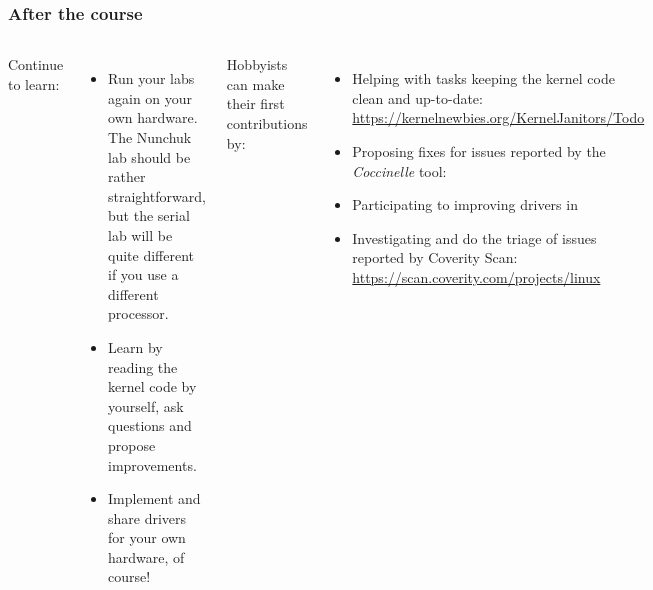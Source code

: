 \begin{frame}
  \frametitle{After the course}
  \begin{columns}
  Continue to learn:
  \begin{itemize}
  \item Run your labs again on your own hardware. The Nunchuk lab should
        be rather straightforward, but the serial lab will be quite different
	if you use a different processor.
  \item Learn by reading the kernel code by yourself, ask questions and
	propose improvements.
  \item Implement and share drivers for your own hardware, of course!
  \end{itemize}
  Hobbyists can make their first contributions by:
  \begin{itemize}
  \item Helping with tasks keeping the kernel code clean and up-to-date:\\
	\url{https://kernelnewbies.org/KernelJanitors/Todo}
  \item Proposing fixes for issues reported by the {\em Coccinelle} tool:\\
  \item Participating to improving drivers in 
  \item Investigating and do the triage of issues reported by Coverity Scan:
        \url{https://scan.coverity.com/projects/linux}
  \end{itemize}
  \end{columns}
\end{frame}
